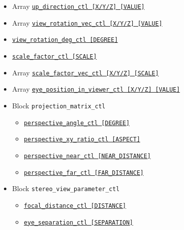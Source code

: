 \begin{itemize}
\begin{itemize}
					{\tt eye\_position\_ctl   [X/Y/Z]     [VALUE]}
			\item Array \hyperref[href_t:up_direction_ctl]
					{\tt up\_direction\_ctl   [X/Y/Z]     [VALUE]}
			\item Array \hyperref[href_t:view_rotation_vec_ctl]
					{\tt view\_rotation\_vec\_ctl   [X/Y/Z]     [VALUE]}
			\item \hyperref[href_t:view_rotation_deg_ctl]
					{\tt view\_rotation\_deg\_ctl     [DEGREE]}
			\item \hyperref[href_t:scale_factor_ctl]
					{\tt scale\_factor\_ctl     [SCALE]}
			\item Array \hyperref[href_t:scale_factor_vec_ctl]
					{\tt scale\_factor\_vec\_ctl  [X/Y/Z]     [SCALE]}
			\item Array \hyperref[href_t:eye_position_in_viewer_ctl]
					{\tt eye\_position\_in\_viewer\_ctl   [X/Y/Z]    [VALUE]}
%
%
   			\item Block \verb|projection_matrix_ctl|
						\label{href_i:projection_matrix_ctl}
				\begin{itemize}
					\item \hyperref[href_t:perspective_angle_ctl]
							{\tt perspective\_angle\_ctl   [DEGREE]}
					\item \hyperref[href_t:perspective_xy_ratio_ctl]
							{\tt perspective\_xy\_ratio\_ctl   [ASPECT]}
					\item \hyperref[href_t:perspective_near_ctl]
							{\tt perspective\_near\_ctl   [NEAR\_DISTANCE]}
					\item \hyperref[href_t:perspective_far_ctl]
							{\tt perspective\_far\_ctl   [FAR\_DISTANCE]}
%
				\end{itemize}
%
    			\item Block \verb|stereo_view_parameter_ctl|
						\label{href_i:stereo_view_parameter_ctl}
				\begin{itemize}
					\item \hyperref[href_t:focal_distance_ctl]
							{\tt focal\_distance\_ctl   [DISTANCE]}
					\item \hyperref[href_t:eye_separation_ctl]
							{\tt eye\_separation\_ctl   [SEPARATION]}

\end{itemize}
\end{itemize}
\end{itemize}

